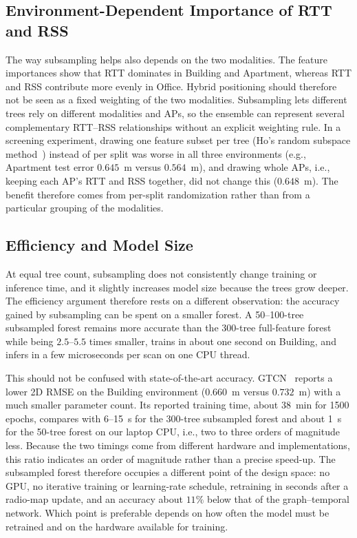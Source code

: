 \subsection{Environment-Dependent Importance of RTT and RSS}
\label{subsec:discussion_modalities}

The way subsampling helps also depends on the two modalities. The feature importances show that RTT dominates in Building and Apartment, whereas RTT and RSS contribute more evenly in Office. Hybrid positioning should therefore not be seen as a fixed weighting of the two modalities. Subsampling lets different trees rely on different modalities and APs, so the ensemble can represent several complementary RTT--RSS relationships without an explicit weighting rule. In a screening experiment, drawing one feature subset per tree (Ho's random subspace method~\cite{ho1998random}) instead of per split was worse in all three environments (e.g., Apartment test error $0.645$~m versus $0.564$~m), and drawing whole APs, i.e., keeping each AP's RTT and RSS together, did not change this ($0.648$~m). The benefit therefore comes from per-split randomization rather than from a particular grouping of the modalities.

\subsection{Efficiency and Model Size}
\label{subsec:discussion_efficiency}

At equal tree count, subsampling does not consistently change training or inference time, and it slightly increases model size because the trees grow deeper. The efficiency argument therefore rests on a different observation: the accuracy gained by subsampling can be spent on a smaller forest. A 50--100-tree subsampled forest remains more accurate than the 300-tree full-feature forest while being $2.5$--$5.5$ times smaller, trains in about one second on Building, and infers in a few microseconds per scan on one CPU thread.

This should not be confused with state-of-the-art accuracy. GTCN~\cite{rana2025gtcn} reports a lower 2D RMSE on the Building environment ($0.660$~m versus $0.732$~m) with a much smaller parameter count. Its reported training time, about 38~min for 1500 epochs, compares with 6--15~s for the 300-tree subsampled forest and about 1~s for the 50-tree forest on our laptop CPU, i.e., two to three orders of magnitude less. Because the two timings come from different hardware and implementations, this ratio indicates an order of magnitude rather than a precise speed-up. The subsampled forest therefore occupies a different point of the design space: no GPU, no iterative training or learning-rate schedule, retraining in seconds after a radio-map update, and an accuracy about $11\%$ below that of the graph--temporal network. Which point is preferable depends on how often the model must be retrained and on the hardware available for training.

